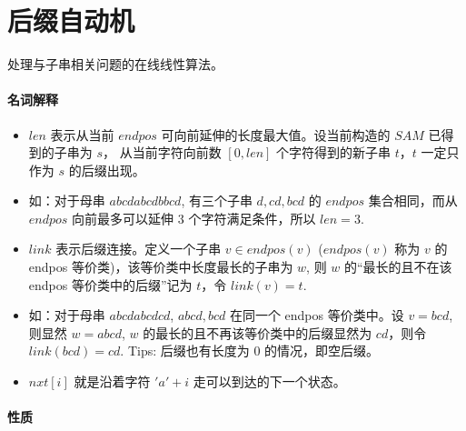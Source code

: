 \section{后缀自动机}
处理与子串相关问题的在线线性算法。
\paragraph{名词解释}
\begin{itemize}
\item  $len$ 表示从当前 $endpos$ 可向前延伸的长度最大值。设当前构造的 $SAM$ 已得到的子串为 $s$， 从当前字符向前数 $[0, len]$ 个字符得到的新子串 $t$，$t$ 一定只作为 $s$ 的后缀出现。
\item 如：对于母串 $abcdabcdbbcd$, 有三个子串 $d, cd, bcd$ 的 $endpos$ 集合相同，而从 $endpos$ 向前最多可以延伸 $3$ 个字符满足条件，所以 $len = 3$.
\item  $link$ 表示后缀连接。定义一个子串 $v \in endpos(v)$ ($endpos(v)$ 称为 $v$ 的 endpos 等价类)，该等价类中长度最长的子串为 $w$, 则 $w$ 的“最长的且不在该 endpos 等价类中的后缀”记为 $t$，令 $link(v) = t$.
\item 如：对于母串 $abcdabcdcd$, $abcd, bcd$ 在同一个 endpos 等价类中。设 $v = bcd$, 则显然 $w = abcd$, $w$ 的最长的且不再该等价类中的后缀显然为 $cd$，则令 $link(bcd) = cd$. Tips: 后缀也有长度为 0 的情况，即空后缀。
\item  $nxt[i]$ 就是沿着字符 $'a' + i$ 走可以到达的下一个状态。
\end{itemize}

\paragraph{性质}

